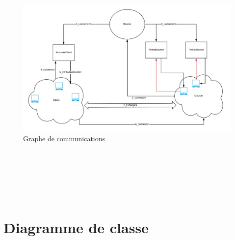 \documentclass[11pt]{article}
\begin{document}
\begin{figure}[!htb]
  \centering
    \caption{Graphe de communications}
    \includegraphics[width=\textwidth]{communication.png}
\newline \newline
\end{figure}

\phantom \\ 
\phantom \\ 
\phantom \\ 
\phantom \\ 
\phantom \\ 

\section{Diagramme de classe}
\end{document}
